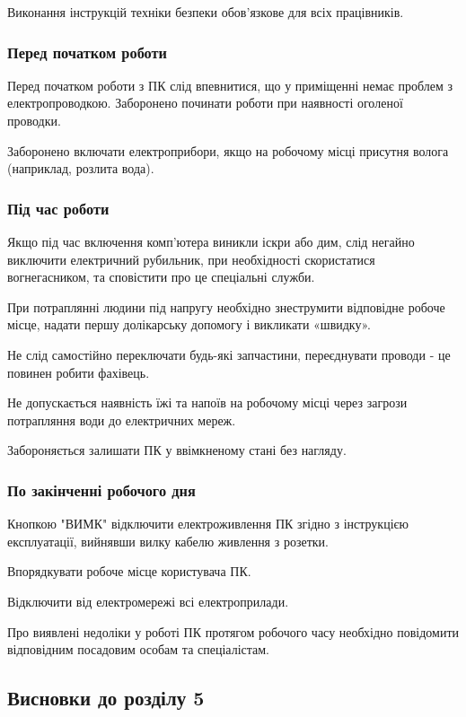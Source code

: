     Виконання інструкцій техніки безпеки обов'язкове для всіх працівників.

    \subsubsection{Перед початком роботи}

    Перед початком роботи з ПК слід впевнитися, що у приміщенні немає проблем з електропроводкою. Заборонено починати роботи при наявності оголеної проводки.
    
    Заборонено включати електроприбори, якщо на робочому місці присутня волога (наприклад, розлита вода).
    
    \subsubsection{Під час роботи}
    Якщо під час включення комп'ютера виникли іскри або дим, слід негайно виключити електричний рубильник,
    при необхідності скористатися вогнегасником, та сповістити про це спеціальні служби.

    При потраплянні людини під напругу необхідно знеструмити відповідне робоче місце, надати першу долікарську допомогу і викликати «швидку».

    Не слід самостійно переключати будь-які запчастини, переєднувати проводи - це повинен робити фахівець.

    Не допускається наявність їжі та напоїв на робочому місці через загрози потрапляння води до електричних мереж.

    Забороняється залишати ПК у ввімкненому стані без нагляду.

    \subsubsection{По закінченні робочого дня}
    Кнопкою "ВИМК" відключити електроживлення ПК згідно з інструкцією експлуатації, вийнявши вилку кабелю живлення з розетки.

    Впорядкувати робоче місце користувача ПК.

    Відключити від електромережі всі електроприлади.

    Про виявлені недоліки у роботі ПК протягом робочого часу необхідно повідомити відповідним посадовим
    особам та спеціалістам.

\subsection{Висновки до розділу 5}

